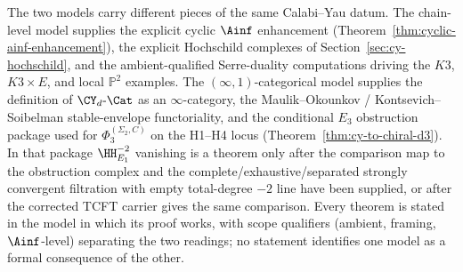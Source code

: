 \begin{remark}
\label{rem:cy-cat-chain-infinity-parity}
The two models carry different pieces of the same Calabi--Yau datum.
The chain-level model supplies the explicit
cyclic $\Ainf$ enhancement (Theorem~\ref{thm:cyclic-ainf-enhancement}),
the explicit Hochschild complexes of Section~\ref{sec:cy-hochschild},
and the ambient-qualified Serre-duality computations driving the
$K3$, $K3\times E$, and local $\mathbb P^2$ examples. The
$(\infty,1)$-categorical model supplies the definition of
$\CY_d\text{-}\Cat$ as an $\infty$-category, the Maulik--Okounkov /
Kontsevich--Soibelman stable-envelope functoriality, and the
conditional $E_3$ obstruction package used for
$\Phi_3^{(\Sigma_2,C)}$ on the H1--H4 locus
(Theorem~\ref{thm:cy-to-chiral-d3}). In that package
$\HH^{-2}_{E_1}$ vanishing is a theorem only after the comparison map
to the obstruction complex and the complete/exhaustive/separated
strongly convergent filtration with empty total-degree $-2$ line have
been supplied, or after the corrected TCFT carrier gives the same
comparison. Every theorem is stated in the
model in which its proof works, with scope qualifiers
(ambient, framing, $\Ainf$-level) separating the two readings;
no statement identifies one model as a formal consequence of the other.
\end{remark}

